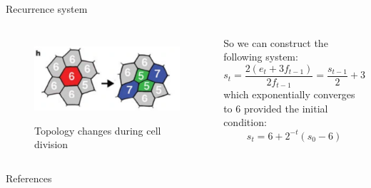 \documentclass[aspectratio=169, 10pt]{beamer}
\begin{document}
\begin{frame}[fragile]{Recurrence system}
  \begin{columns}
  \begin{figure}[]
    \centering
    \caption{Topology changes during cell division}
    \includegraphics[width=.5\textwidth]{figures/topology_evolution.png} 
    \label{}
  \end{figure}
  
  \begin{table}
    \caption{Cell features, topological equivalence and evolution at division $t$}
  \end{table}
  So we can construct the following system: 
  \begin{equation*}
    s_t=\frac{2(e_t+3f_{t-1})}{2f_{t-1}}=\frac{s_{t-1}}{2}+3
  \end{equation*}
  which exponentially converges to 6 provided the initial condition:
  \begin{equation*}
    s_t=6+2^{-t}(s_0-6)
  \end{equation*} 
\end{columns}
\end{frame}


\begin{frame}[allowframebreaks]{References}

  
  

\end{frame}
\end{document}
